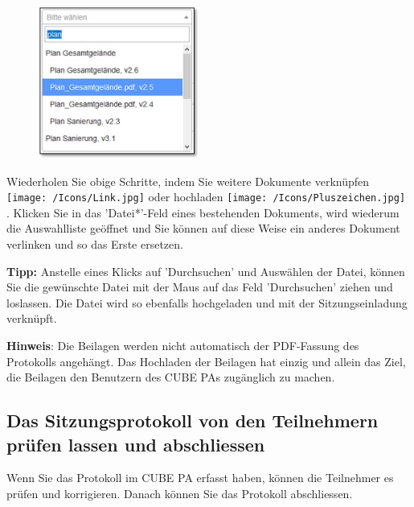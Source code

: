 \begin{figure}
  \vspace{-40pt}
  \begin{center}
    \includegraphics[height=50mm]{../chapters/05_Sitzungswesen/pictures/5-2-3_Verknuepfen.jpg}
  \end{center}
  \vspace{-20pt}
  \vspace{-10pt}
\end{figure}
Wiederholen Sie obige Schritte, indem Sie weitere Dokumente verknüpfen \texttt{[image: /Icons/Link.jpg]}  oder hochladen \texttt{[image: /Icons/Pluszeichen.jpg]} . Klicken Sie in das 'Datei*'-Feld eines bestehenden Dokuments, wird wiederum die Auswahlliste geöffnet und Sie können auf diese Weise ein anderes Dokument verlinken und so das Erste ersetzen. 


\vspace{1.5cm} 

\textbf{Tipp:} Anstelle eines Klicks auf 'Durchsuchen' und Auswählen der Datei, können Sie die gewünschte Datei mit der Maus auf das Feld 'Durchsuchen' ziehen und loslassen. Die Datei wird so ebenfalls hochgeladen und mit der Sitzungseinladung verknüpft.

\vspace{\baselineskip}

\textbf{Hinweis}: Die Beilagen werden nicht automatisch der PDF-Fassung des Protokolls angehängt. Das Hochladen der Beilagen hat einzig und allein das Ziel, die Beilagen den Benutzern des CUBE PAs zugänglich zu machen.

\subsection{Das Sitzungsprotokoll von den Teilnehmern prüfen lassen und abschliessen}
\label{bkm:Ref434478117}
Wenn Sie das Protokoll im CUBE PA erfasst haben, können die Teilnehmer es prüfen und korrigieren. Danach können Sie das Protokoll abschliessen.

